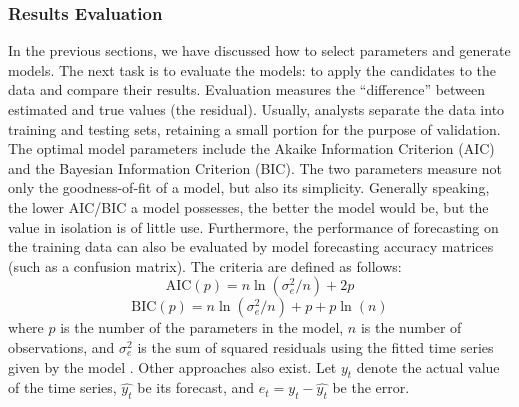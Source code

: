 \subsubsection{Results Evaluation}
In the previous sections, we have discussed how to select parameters and generate models. The next task is to evaluate the models: to apply the candidates to the data and compare their results. Evaluation measures the ``difference'' between estimated and true values (the residual). Usually, analysts separate the data into training and testing sets, retaining a small portion for the purpose of validation. The optimal model parameters include the Akaike Information Criterion (AIC) and the Bayesian Information Criterion (BIC). The two parameters measure not only the goodness-of-fit of a model, but also its simplicity. Generally speaking, the lower AIC/BIC a model possesses, the better the model would be, but the value in isolation is of little use. Furthermore, the performance of forecasting on the training data can also be evaluated by model forecasting accuracy matrices (such as a confusion matrix). The criteria are defined as follows:
\begin{equation*}
\mathrm{AIC}(p)=n \ln(\sigma^2_e/n)+2p 
\end{equation*}
\begin{equation*} 
\mathrm{BIC}(p)=n \ln(\sigma^2_e/n)+p+p \ln(n)
\end{equation*}
where $p$ is the number of the parameters in the model, $n$ is the number of observations, and $\sigma^2_e$ is the sum of squared residuals using the fitted time series given by the model . 
\newl Other approaches also exist. Let $y_t$ denote the actual value of the time series, $\hat{y_t}$ be its forecast, and $e_t=y_t-\hat{y_t}$ be the error.
